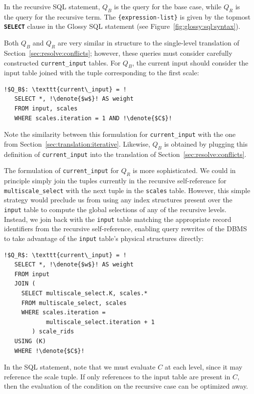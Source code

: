 \documentclass[11pt, oneside]{report}
\newcommand{\denote}[1]{\text{$[\![ $#1$ ]\!]$}}
\begin{document}
{In the recursive SQL statement, $Q_B$ is the query for the base case, while $Q_R$ is the query for the recursive term. The \texttt{\{expression-list\}} is given by the topmost \textbf{\texttt{SELECT}} clause in the Glossy SQL statement (see Figure~\ref{fig:glossy:sql:syntax}).    

Both $Q_B$ and $Q_R$ are very similar in structure to the single-level translation of Section~\ref{sec:resolve:conflicts}; however, these queries must consider carefully constructed \texttt{current\_input} tables. For $Q_B$, the current input should consider the input table joined with the tuple corresponding to the first scale:

\begin{lstlisting}[escapechar=!]
  !$Q_B$: \texttt{current\_input} = !
   SELECT *, !\denote{$w$}! AS weight
   FROM input, scales
   WHERE scales.iteration = 1 AND !\denote{$C$}!   
\end{lstlisting}

Note the similarity between this formulation for \texttt{current\_input} with the one from Section~\ref{sec:translation:iterative}. Likewise, $Q_B$ is obtained by plugging this definition of \texttt{current\_input} into the translation of Section~\ref{sec:resolve:conflicts}. 
    
 The formulation of \texttt{current\_input} for $Q_R$ is more sophisticated. We could in principle simply join the tuples currently in the recursive self-reference for \texttt{multiscale\_select} with the next tuple in the \texttt{scales} table. However, this simple strategy would preclude us from using any index structures present over the \texttt{input} table to compute the global selections of any of the recursive levels. Instead, we join back with the \texttt{input} table matching the appropriate record identifiers from the recursive self-reference, enabling query rewrites of the DBMS to take advantage of the \texttt{input} table's physical structures directly:
 
\begin{lstlisting}[escapechar=!]
  !$Q_R$: \texttt{current\_input} = !
   SELECT *, !\denote{$w$}! AS weight
   FROM input
   JOIN (
     SELECT multiscale_select.K, scales.*
     FROM multiscale_select, scales
     WHERE scales.iteration =
            multiscale_select.iteration + 1
        ) scale_rids
   USING (K)
   WHERE !\denote{$C$}! 
\end{lstlisting}
 
In the SQL statement, note that we must evaluate $C$ at each level, since it may reference the scale tuple. If only references to the input table are present in $C$, then the evaluation of the condition on the recursive case can be optimized away.  

}
\end{document}
